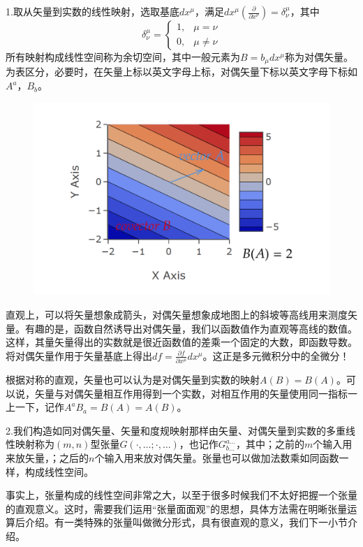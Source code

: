 \documentclass{article}
\begin{document}
1.取从矢量到实数的线性映射，选取基底$dx^\mu $，满足$dx^\mu (\frac{\partial}{\partial x^\nu })=\delta ^\mu _\nu$，其中
\begin{equation*}
    \delta ^\mu _\nu =
    \begin{cases}
    1,&\mu=\nu
    \\0,&\mu\neq \nu
\end{cases}
\end{equation*}
所有映射构成线性空间称为余切空间，其中一般元素为$B=b_\mu dx^\mu $称为对偶矢量。为表区分，必要时，在矢量上标以英文字母上标，对偶矢量下标以英文字母下标如$A^a$，$B_b$。

\begin{figure}[htbp]
    \centering
    \includegraphics[scale=0.25]{5.png}
\end{figure}

直观上，可以将矢量想象成箭头，对偶矢量想象成地图上的斜坡等高线用来测度矢量。有趣的是，函数自然诱导出对偶矢量，我们以函数值作为直观等高线的数值。这样，其量矢量得出的实数就是很近函数值的差乘一个固定的大数，即函数导数。将对偶矢量作用于矢量基底上得出$df=\frac{\partial f}{\partial x^\mu }dx^\mu $。这正是多元微积分中的全微分！

根据对称的直观，矢量也可以认为是对偶矢量到实数的映射$A(B)=B(A)$。可以说，矢量与对偶矢量相互作用得到一个实数，对相互作用的矢量使用同一指标一上一下，记作$A^a B_a=B(A)=A(B)$。

2.我们构造如同对偶矢量、矢量和度规映射那样由矢量、对偶矢量到实数的多重线性映射称为$(m,n)$型张量$G(\cdot,\dots;\cdot,\dots)$，也记作$G^{a\dots}_{b\dots}$，其中；之前的$m$个输入用来放矢量，；之后的$n$个输入用来放对偶矢量。张量也可以做加法数乘如同函数一样，构成线性空间。

事实上，张量构成的线性空间非常之大，以至于很多时候我们不太好把握一个张量的直观意义。这时，需要我们运用“张量面面观”的思想，具体方法需在明晰张量运算后介绍。有一类特殊的张量叫做微分形式，具有很直观的意义，我们下一小节介绍。
\end{document}
